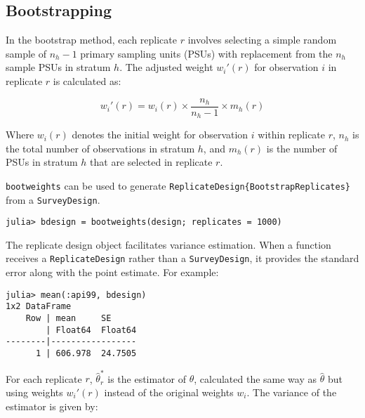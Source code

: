 \documentclass{juliacon}
\begin{document}
\subsection{Bootstrapping}



In the bootstrap method, each replicate \( r \) involves selecting a simple random sample of \( n_h - 1 \) primary sampling units (PSUs) with replacement from the \( n_h \) sample PSUs in stratum \( h \). The adjusted weight \( w_i'(r) \) for observation \( i \) in replicate \( r \) is calculated as:



\begin{equation}
    w_i'(r) = w_i(r) \times \frac{n_h}{n_h - 1} \times m_{h}(r)
\end{equation}

Where \( w_i(r) \) denotes the initial weight for observation \( i \) within replicate \( r \), \( n_h \) is the total number of observations in stratum \( h \), and \( m_{h}(r) \) is the number of PSUs in stratum \( h \) that are selected in replicate \( r \)\cite{Lohr}.

\verb|bootweights| can be used to generate \verb|ReplicateDesign{BootstrapReplicates}| from a \verb|SurveyDesign|. 

\begin{lstlisting}
julia> bdesign = bootweights(design; replicates = 1000)
\end{lstlisting}




The replicate design object facilitates variance estimation. When a function receives a \verb|ReplicateDesign| rather than a \verb|SurveyDesign|, it provides the standard error along with the point estimate.
For example: 
\begin{lstlisting}
julia> mean(:api99, bdesign)
1x2 DataFrame
    Row | mean     SE      
        | Float64  Float64 
--------|-----------------
      1 | 606.978  24.7505
    \end{lstlisting}
For each replicate $r$, $\hat{\theta}^*_r$ is the estimator of $\theta$, calculated the same way as $\hat{\theta}$ but using weights $w_i'(r)$ instead of the original weights $w_i$. The variance of the estimator is given by: 
\end{document}
